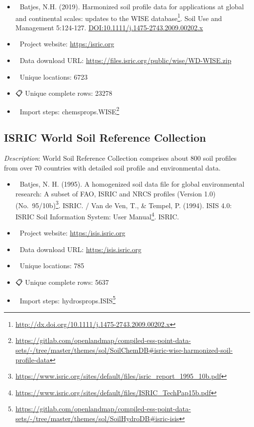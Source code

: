 \documentclass[
  graybox,natbib,nospthms]{svmono}
\providecommand{\tightlist}{%
  \setlength{\itemsep}{0pt}\setlength{\parskip}{0pt}}
\providecommand{\tightlist}{\setlength{\itemsep}{0pt}\setlength{\parskip}{0pt}}
\renewcommand{\href}[2]{#2 (\url{#1})}
\renewcommand{\href}[2]{#2\footnote{\url{#1}}}
\begin{document}
\begin{itemize}
\tightlist
\item
  📕 Batjes, N.H. (2019). \href{http://dx.doi.org/10.1111/j.1475-2743.2009.00202.x}{Harmonized soil profile data for applications at global and continental scales: updates to the WISE database}. Soil Use and Management 5:124-127. \url{DOI:10.1111/j.1475-2743.2009.00202.x}\\
\item
  🔗 Project website: \url{https:/isric.org}\\
\item
  📂 Data download URL: \url{https://files.isric.org/public/wise/WD-WISE.zip}\\
\item
  📍 Unique locations: 6723\\
\item
  📋 Unique complete rows: 23278\\
\item
  📝 Import steps: \href{https://gitlab.com/openlandmap/compiled-ess-point-data-sets/-/tree/master/themes/sol/SoilChemDB\#isric-wise-harmonized-soil-profile-data}{chemsprops.WISE}
\end{itemize}

\hypertarget{isric-world-soil-reference-collection}{%
\subsection{ISRIC World Soil Reference Collection}\label{isric-world-soil-reference-collection}}

\emph{Description}: World Soil Reference Collection comprises about 800 soil profiles
from over 70 countries with detailed soil profile and environmental data.

\begin{itemize}
\tightlist
\item
  📕 Batjes, N. H. (1995). \href{https://www.isric.org/sites/default/files/isric_report_1995_10b.pdf}{A homogenized soil data file for global
  environmental research: A subset of FAO, ISRIC and NRCS profiles (Version 1.0) (No.~95/10b)}. ISRIC. / Van de Ven, T., \& Tempel, P. (1994). \href{https://www.isric.org/sites/default/files/ISRIC_TechPap15b.pdf}{ISIS 4.0: ISRIC Soil Information System: User Manual}. ISRIC.\\
\item
  🔗 Project website: \url{https:/isis.isric.org}\\
\item
  📂 Data download URL: \url{https:/isis.isric.org}\\
\item
  📍 Unique locations: 785\\
\item
  📋 Unique complete rows: 5637\\
\item
  📝 Import steps: \href{https://gitlab.com/openlandmap/compiled-ess-point-data-sets/-/tree/master/themes/sol/SoilHydroDB\#isric-isis}{hydrosprops.ISIS}
\end{itemize}
\end{document}
